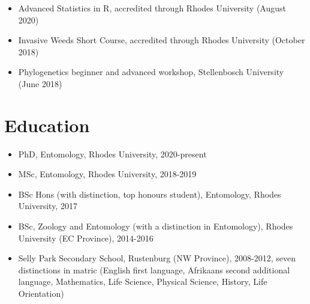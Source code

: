 \documentclass{article}
\begin{document}
\begin{itemize}

\item Advanced Statistics in R, accredited through Rhodes University (August 2020)
\item Invasive Weeds Short Course, accredited through Rhodes University (October 2018)
\item Phylogenetics beginner and advanced workshop, Stellenbosch University (June 2018)

\end{itemize}

\section{Education}

\begin{itemize}
\item PhD, Entomology, Rhodes University, 2020-present 
\item MSc, Entomology, Rhodes University, 2018-2019
\item BSc Hons (with distinction, top honours student), Entomology, Rhodes University, 2017  
\item BSc, Zoology and Entomology (with a distinction in Entomology), Rhodes University (EC Province), 2014-2016
\item Selly Park Secondary School, Rustenburg (NW Province), 2008-2012, seven distinctions in matric (English first language, Afrikaans second additional language, Mathematics, Life Science, Physical Science, History, Life Orientation)
\end{itemize}
 
\end{document}
